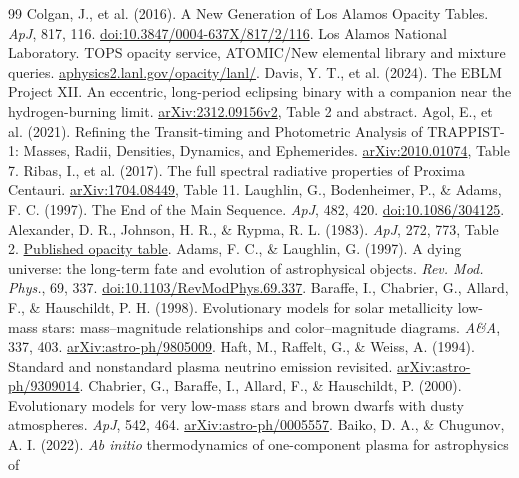\documentclass[11pt,letterpaper]{article}
\begin{document}
\begin{thebibliography}{99}\small
{} Colgan, J., et al. (2016).
A New Generation of Los Alamos Opacity Tables. \textit{ApJ}, 817, 116.
\href{https://doi.org/10.3847/0004-637X/817/2/116}{doi:10.3847/0004-637X/817/2/116}.
 Los Alamos National Laboratory. TOPS opacity service,
ATOMIC/New elemental library and mixture queries.
\href{https://aphysics2.lanl.gov/opacity/lanl/}{aphysics2.lanl.gov/opacity/lanl/}.
 Davis, Y. T., et al. (2024).
The EBLM Project XII. An eccentric, long-period eclipsing binary with a companion
near the hydrogen-burning limit.
\href{https://arxiv.org/pdf/2312.09156v2}{arXiv:2312.09156v2}, Table 2 and abstract.
 Agol, E., et al. (2021).
Refining the Transit-timing and Photometric Analysis of TRAPPIST-1:
Masses, Radii, Densities, Dynamics, and Ephemerides.
\href{https://arxiv.org/pdf/2010.01074}{arXiv:2010.01074}, Table 7.
 Ribas, I., et al. (2017).
The full spectral radiative properties of Proxima Centauri.
\href{https://arxiv.org/pdf/1704.08449}{arXiv:1704.08449}, Table 11.
 Laughlin, G., Bodenheimer, P., \& Adams, F. C. (1997).
The End of the Main Sequence. \emph{ApJ}, 482, 420.
\href{https://doi.org/10.1086/304125}{doi:10.1086/304125}.
 Alexander, D. R., Johnson, H. R., \& Rypma, R. L. (1983).
\emph{ApJ}, 272, 773, Table 2.
\href{https://adsabs.harvard.edu/pdf/1983ApJ...272..773A}{Published opacity table}.
 Adams, F. C., \& Laughlin, G. (1997).
A dying universe: the long-term fate and evolution of astrophysical objects.
\emph{Rev. Mod. Phys.}, 69, 337.
\href{https://doi.org/10.1103/RevModPhys.69.337}{doi:10.1103/RevModPhys.69.337}.
 Baraffe, I., Chabrier, G., Allard, F., \& Hauschildt, P. H. (1998).
Evolutionary models for solar metallicity low-mass stars: mass--magnitude
relationships and color--magnitude diagrams. \emph{A\&A}, 337, 403.
\href{https://arxiv.org/abs/astro-ph/9805009}{arXiv:astro-ph/9805009}.
 Haft, M., Raffelt, G., \& Weiss, A. (1994).
Standard and nonstandard plasma neutrino emission revisited.
\href{https://arxiv.org/abs/astro-ph/9309014}{arXiv:astro-ph/9309014}.
 Chabrier, G., Baraffe, I., Allard, F., \& Hauschildt, P. (2000).
Evolutionary models for very low-mass stars and brown dwarfs with dusty atmospheres.
\emph{ApJ}, 542, 464.
\href{https://arxiv.org/abs/astro-ph/0005557}{arXiv:astro-ph/0005557}.
 Baiko, D. A., \& Chugunov, A. I. (2022).
\emph{Ab initio} thermodynamics of one-component plasma for astrophysics of

\end{thebibliography}
\end{document}
